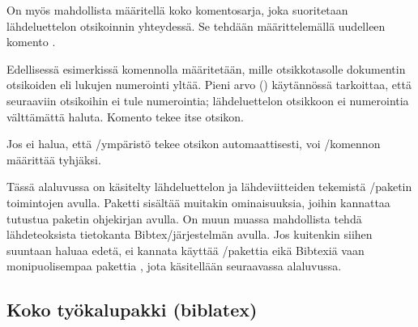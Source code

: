 \begin{koodilohkosis}
  \addto{\captionsfinnish}{%
    \renewcommand{\refname}{Lähteet} %
    \renewcommand{\bibname}{Lähteet} %
  }
\end{koodilohkosis}

On myös mahdollista määritellä koko komentosarja, joka suoritetaan
lähdeluettelon otsikoinnin yhteydessä. Se tehdään määrittelemällä
uudelleen komento .

\begin{koodilohkosis}
  \renewcommand{\bibsection}{%
    \setcounter{secnumdepth}{-1}
    \section{Lähteet}
  }
\end{koodilohkosis}

Edellisessä esimerkissä komennolla 
määritetään, mille otsikkotasolle dokumentin otsikoiden eli lukujen
numerointi yltää. Pieni arvo \mbox{()} käytännössä tarkoittaa,
että seuraaviin otsikoihin ei tule numerointia; lähdeluettelon otsikkoon
ei numerointia välttämättä haluta. Komento  tekee
itse otsikon.

Jos ei halua, että \-/ympäristö tekee otsikon
automaattisesti, voi \-/komennon määrittää
tyhjäksi.

\begin{koodilohkosis}
  \renewcommand{\bibsection}{}
\end{koodilohkosis}

Tässä alaluvussa on käsitelty lähdeluettelon ja lähdeviitteiden
tekemistä \-/paketin toimintojen avulla. Paketti
sisältää muitakin ominaisuuksia, joihin kannattaa tutustua paketin
ohjekirjan avulla. On muun muassa mahdollista tehdä lähdeteoksista
tietokanta Bibtex\-/järjestelmän avulla. Jos kuitenkin siihen suuntaan
haluaa edetä, ei kannata käyttää \-/pakettia eikä
Bibtexiä vaan monipuolisempaa pakettia , jota
käsitellään seuraavassa alaluvussa.

\subsection{Koko työkalupakki (biblatex)}
\label{luku:biblatex}


